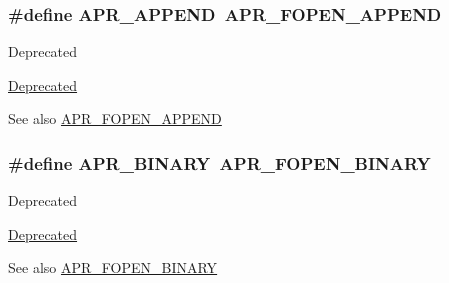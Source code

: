 \subsubsection[{\texorpdfstring{A\+P\+R\+\_\+\+A\+P\+P\+E\+ND}{APR_APPEND}}]{\setlength{\rightskip}{0pt plus 5cm}\#define A\+P\+R\+\_\+\+A\+P\+P\+E\+ND~{\bf A\+P\+R\+\_\+\+F\+O\+P\+E\+N\+\_\+\+A\+P\+P\+E\+ND}}\hypertarget{group__apr__file__open__flags_ga26d3de2bae5c90e5124869f56c141c2e}{}\label{group__apr__file__open__flags_ga26d3de2bae5c90e5124869f56c141c2e}
\begin{DoxyRefDesc}{Deprecated}
\item[\hyperlink{deprecated__deprecated000027}{Deprecated}]\end{DoxyRefDesc}
\begin{DoxySeeAlso}{See also}
\hyperlink{group__apr__file__open__flags_ga45f353db9b71d4760a3f35cf3781cfc8}{A\+P\+R\+\_\+\+F\+O\+P\+E\+N\+\_\+\+A\+P\+P\+E\+ND} 
\end{DoxySeeAlso}
\subsubsection[{\texorpdfstring{A\+P\+R\+\_\+\+B\+I\+N\+A\+RY}{APR_BINARY}}]{\setlength{\rightskip}{0pt plus 5cm}\#define A\+P\+R\+\_\+\+B\+I\+N\+A\+RY~{\bf A\+P\+R\+\_\+\+F\+O\+P\+E\+N\+\_\+\+B\+I\+N\+A\+RY}}\hypertarget{group__apr__file__open__flags_ga0e7556bac0cc0d1dafdf38952a4e4015}{}\label{group__apr__file__open__flags_ga0e7556bac0cc0d1dafdf38952a4e4015}
\begin{DoxyRefDesc}{Deprecated}
\item[\hyperlink{deprecated__deprecated000029}{Deprecated}]\end{DoxyRefDesc}
\begin{DoxySeeAlso}{See also}
\hyperlink{group__apr__file__open__flags_gacb20b3028864f34cb26314fe2cacc3fa}{A\+P\+R\+\_\+\+F\+O\+P\+E\+N\+\_\+\+B\+I\+N\+A\+RY} 
\end{DoxySeeAlso}
